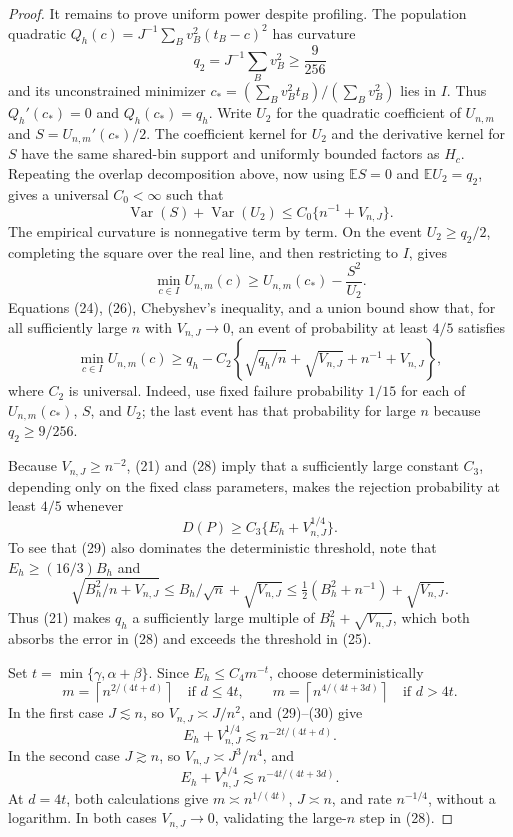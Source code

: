 \documentclass{article}
\begin{document}
\begin{proof}
It remains to prove uniform power despite profiling. The population quadratic \(Q_h(c)=J^{-1}\sum_Bv_B^2(t_B-c)^2\) has curvature
\[
 q_2=J^{-1}\sum_Bv_B^2\ge\frac9{256}
\]
and its unconstrained minimizer \(c_*=(\sum_Bv_B^2t_B)/(\sum_Bv_B^2)\) lies in \(I\). Thus \(Q_h'(c_*)=0\) and \(Q_h(c_*)=q_h\). Write \(U_2\) for the quadratic coefficient of \(U_{n,m}\) and \(S=U_{n,m}'(c_*)/2\). The coefficient kernel for \(U_2\) and the derivative kernel for \(S\) have the same shared-bin support and uniformly bounded factors as \(H_c\). Repeating the overlap decomposition above, now using \(\mathbb ES=0\) and \(\mathbb EU_2=q_2\), gives a universal \(C_0<\infty\) such that
\[
 \operatorname{Var}(S)+\operatorname{Var}(U_2)
 \le C_0\{n^{-1}+V_{n,J}\}.                                        \tag{26}
\]
The empirical curvature is nonnegative term by term. On the event \(U_2\ge q_2/2\), completing the square over the real line, and then restricting to \(I\), gives
\[
 \min_{c\in I}U_{n,m}(c)
 \ge U_{n,m}(c_*)-\frac{S^2}{U_2}.                                  \tag{27}
\]
Equations (24), (26), Chebyshev's inequality, and a union bound show that, for all sufficiently large \(n\) with \(V_{n,J}\to0\), an event of probability at least \(4/5\) satisfies
\[
 \min_{c\in I}U_{n,m}(c)
 \ge q_h-C_2\left\{\sqrt{q_h/n}+\sqrt{V_{n,J}}+n^{-1}+V_{n,J}\right\}, \tag{28}
\]
where \(C_2\) is universal. Indeed, use fixed failure probability \(1/15\) for each of \(U_{n,m}(c_*)\), \(S\), and \(U_2\); the last event has that probability for large \(n\) because \(q_2\ge9/256\).

Because \(V_{n,J}\ge n^{-2}\), (21) and (28) imply that a sufficiently large constant \(C_3\), depending only on the fixed class parameters, makes the rejection probability at least \(4/5\) whenever
\[
 D(P)\ge C_3\{E_h+V_{n,J}^{1/4}\}.                                  \tag{29}
\]
To see that (29) also dominates the deterministic threshold, note that \(E_h\ge(16/3)B_h\) and
\[
 \sqrt{B_h^2/n+V_{n,J}}
 \le B_h/\sqrt n+\sqrt{V_{n,J}}
 \le\tfrac12(B_h^2+n^{-1})+\sqrt{V_{n,J}}.
\]
Thus (21) makes \(q_h\) a sufficiently large multiple of \(B_h^2+\sqrt{V_{n,J}}\), which both absorbs the error in (28) and exceeds the threshold in (25).

Set \(t=\min\{\gamma,\alpha+\beta\}\). Since \(E_h\le C_4m^{-t}\), choose deterministically
\[
 m=\left\lceil n^{2/(4t+d)}\right\rceil
 \quad\text{if }d\le4t,
 \qquad
 m=\left\lceil n^{4/(4t+3d)}\right\rceil
 \quad\text{if }d>4t.                                               \tag{30}
\]
In the first case \(J\lesssim n\), so \(V_{n,J}\asymp J/n^2\), and (29)--(30) give
\[
 E_h+V_{n,J}^{1/4}\lesssim n^{-2t/(4t+d)}.
\]
In the second case \(J\gtrsim n\), so \(V_{n,J}\asymp J^3/n^4\), and
\[
 E_h+V_{n,J}^{1/4}\lesssim n^{-4t/(4t+3d)}.
\]
At \(d=4t\), both calculations give \(m\asymp n^{1/(4t)}\), \(J\asymp n\), and rate \(n^{-1/4}\), without a logarithm. In both cases \(V_{n,J}\to0\), validating the large-\(n\) step in (28).


\end{proof}
\end{document}
